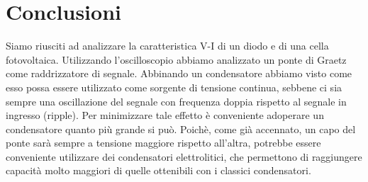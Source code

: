 \section{Conclusioni}
Siamo riusciti ad analizzare la caratteristica V-I di un diodo e di una cella fotovoltaica. Utilizzando l'oscilloscopio abbiamo analizzato un ponte di Graetz come raddrizzatore di segnale. Abbinando un condensatore abbiamo visto come esso possa essere utilizzato come sorgente di tensione continua, sebbene ci sia sempre una oscillazione del segnale con frequenza doppia rispetto al segnale in ingresso (ripple). Per minimizzare tale effetto è conveniente adoperare un condensatore quanto più grande si può. Poichè, come già accennato, un capo del ponte sarà sempre a tensione maggiore rispetto all'altra, potrebbe essere conveniente utilizzare dei condensatori elettrolitici, che permettono di raggiungere capacità molto maggiori di quelle ottenibili con i classici condensatori. 